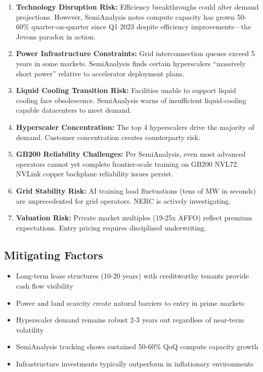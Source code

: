\documentclass[11pt,a4paper]{article}
\begin{document}
\begin{enumerate}[leftmargin=*, itemsep=8pt]
    \item \textbf{Technology Disruption Risk:} Efficiency breakthroughs could alter demand projections. However, SemiAnalysis notes compute capacity has grown 50-60\% quarter-on-quarter since Q1 2023 despite efficiency improvements—the Jevons paradox in action.
    
    \item \textbf{Power Infrastructure Constraints:} Grid interconnection queues exceed 5 years in some markets. SemiAnalysis finds certain hyperscalers ``massively short power'' relative to accelerator deployment plans.
    
    \item \textbf{Liquid Cooling Transition Risk:} Facilities unable to support liquid cooling face obsolescence. SemiAnalysis warns of insufficient liquid-cooling capable datacenters to meet demand.
    
    \item \textbf{Hyperscaler Concentration:} The top 4 hyperscalers drive the majority of demand. Customer concentration creates counterparty risk.
    
    \item \textbf{GB200 Reliability Challenges:} Per SemiAnalysis, even most advanced operators cannot yet complete frontier-scale training on GB200 NVL72. NVLink copper backplane reliability issues persist.
    
    \item \textbf{Grid Stability Risk:} AI training load fluctuations (tens of MW in seconds) are unprecedented for grid operators. NERC is actively investigating.
    
    \item \textbf{Valuation Risk:} Private market multiples (19-25x AFFO) reflect premium expectations. Entry pricing requires disciplined underwriting.
\end{enumerate}

\subsection{Mitigating Factors}

\begin{itemize}[leftmargin=*, itemsep=4pt]
    \item Long-term lease structures (10-20 years) with creditworthy tenants provide cash flow visibility
    \item Power and land scarcity create natural barriers to entry in prime markets
    \item Hyperscaler demand remains robust 2-3 years out regardless of near-term volatility
    \item SemiAnalysis tracking shows sustained 50-60\% QoQ compute capacity growth
    \item Infrastructure investments typically outperform in inflationary environments
\end{itemize}
\end{document}
